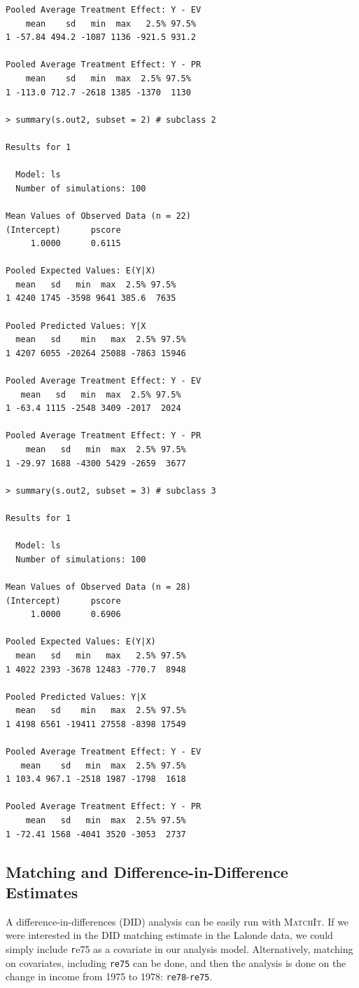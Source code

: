 \documentclass[oneside,letterpaper,titlepage]{article}
\newcommand{\MatchIt}{\textsc{MatchIt}}
\begin{document}
\begin{verbatim}
Pooled Average Treatment Effect: Y - EV
    mean    sd   min  max   2.5% 97.5%
1 -57.84 494.2 -1087 1136 -921.5 931.2

Pooled Average Treatment Effect: Y - PR
    mean    sd   min  max  2.5% 97.5%
1 -113.0 712.7 -2618 1385 -1370  1130

> summary(s.out2, subset = 2) # subclass 2

Results for 1 

  Model: ls 
  Number of simulations: 100 

Mean Values of Observed Data (n = 22) 
(Intercept)      pscore 
     1.0000      0.6115 

Pooled Expected Values: E(Y|X)
  mean   sd   min  max  2.5% 97.5%
1 4240 1745 -3598 9641 385.6  7635

Pooled Predicted Values: Y|X
  mean   sd    min   max  2.5% 97.5%
1 4207 6055 -20264 25088 -7863 15946

Pooled Average Treatment Effect: Y - EV
   mean   sd   min  max  2.5% 97.5%
1 -63.4 1115 -2548 3409 -2017  2024

Pooled Average Treatment Effect: Y - PR
    mean   sd   min  max  2.5% 97.5%
1 -29.97 1688 -4300 5429 -2659  3677

> summary(s.out2, subset = 3) # subclass 3

Results for 1 

  Model: ls 
  Number of simulations: 100 

Mean Values of Observed Data (n = 28) 
(Intercept)      pscore 
     1.0000      0.6906 

Pooled Expected Values: E(Y|X)
  mean   sd   min   max   2.5% 97.5%
1 4022 2393 -3678 12483 -770.7  8948

Pooled Predicted Values: Y|X
  mean   sd    min   max  2.5% 97.5%
1 4198 6561 -19411 27558 -8398 17549

Pooled Average Treatment Effect: Y - EV
   mean    sd   min  max  2.5% 97.5%
1 103.4 967.1 -2518 1987 -1798  1618

Pooled Average Treatment Effect: Y - PR
    mean   sd   min  max  2.5% 97.5%
1 -72.41 1568 -4041 3520 -3053  2737

\end{verbatim}

\subsection{Matching and Difference-in-Difference Estimates}

A difference-in-differences (DID) analysis can be easily run with
\MatchIt.  If we were interested in the DID matching estimate in the
Lalonde data, we could simply include {\texttt re75} as a covariate in
our analysis model.  Alternatively, matching on covariates, including
{\tt re75} can be done, and then the analysis is done on the change in
income from 1975 to 1978: {\tt re78}-{\tt re75}.
\end{document}
